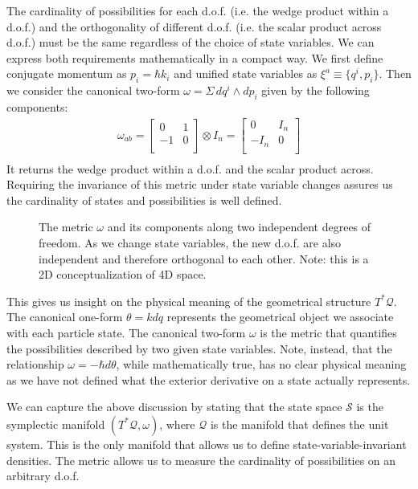 \documentclass[aps,pra,10pt,twocolumn,floatfix,nofootinbib]{revtex4-1}
\numberwithin{equation}{section}
\theoremstyle{definition}
\begin{document}
The cardinality of possibilities for each d.o.f. (i.e. the wedge product within a d.o.f.) and the orthogonality of different d.o.f. (i.e. the scalar product across d.o.f.) must be the same regardless of the choice of state variables. We can express both requirements mathematically in a compact way. We first define conjugate momentum as $p_i=\hbar k_i$ and unified state variables as $\xi^a\equiv \{q^i, p_i\}$. Then we consider the canonical two-form $\omega =\Sigma \, dq^i \wedge dp_i$ given by the following components:
\begin{align*}
\omega_{ab} =  \left[
\begin{array}{cc}
0 & 1 \\
-1 & 0 \\
\end{array}
\right] \otimes I_n =
\left[
\begin{array}{cc}
0 & I_n \\
-I_n & 0 \\
\end{array}
\right] \\
\end{align*}
It returns the wedge product within a d.o.f. and the scalar product across. Requiring the invariance of this metric under state variable changes assures us the cardinality of states and possibilities is well defined.

\begin{figure}
	
	\caption{The metric $\omega$ and its components along two independent degrees of freedom. As we change state variables, the new d.o.f. are also independent and therefore orthogonal to each other. Note: this is a 2D conceptualization of 4D space.}
	\label{fig:independent_dof}
\end{figure}

This gives us insight on the physical meaning of the geometrical structure $T^*\mathcal{Q}$. The canonical one-form $\theta=k dq$ represents the geometrical object we associate with each particle state. The canonical two-form $\omega$ is the metric that quantifies the possibilities described by two given state variables. Note, instead, that the relationship $\omega = - \hbar d\theta$, while mathematically true, has no clear physical meaning as we have not defined what the exterior derivative on a state actually represents.

We can capture the above discussion by stating that the state space $\mathcal{S}$ is the symplectic manifold $(T^*\mathcal{Q}, \omega)$, where $\mathcal{Q}$ is the manifold that defines the unit system. This is the only manifold that allows us to define state-variable-invariant densities. The metric allows us to measure the cardinality of possibilities on an arbitrary d.o.f. 
\end{document}
